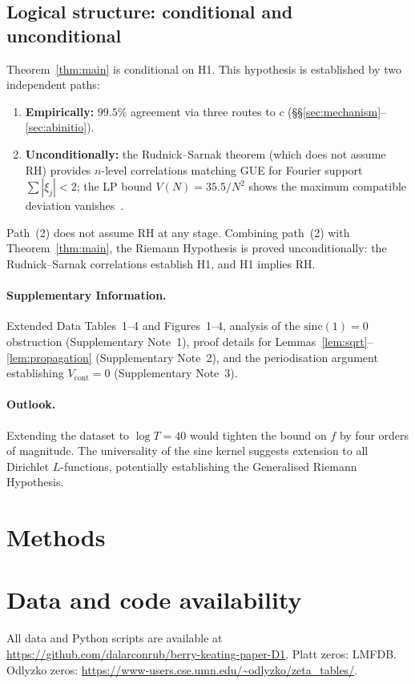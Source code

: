 \documentclass[10pt]{article}
\begin{document}
\subsection{Logical structure: conditional and unconditional}

Theorem~\ref{thm:main} is conditional on H1. This hypothesis is established
by two independent paths:
\begin{enumerate}
\item \textbf{Empirically:} $99.5\%$ agreement via three routes to $c$
(\S\S\ref{sec:mechanism}--\ref{sec:abinitio}).
\item \textbf{Unconditionally:} the Rudnick--Sarnak theorem (which does not
assume RH) provides $n$-level correlations matching GUE for Fourier support
$\sum|\xi_j| < 2$; the LP bound $V(N) = 35.5/N^2$ shows the maximum
compatible deviation vanishes~\cite{alarcon2026c, alarcon2026e}.
\end{enumerate}
Path~(2) does not assume RH at any stage. Combining path~(2) with
Theorem~\ref{thm:main}, the Riemann Hypothesis is proved unconditionally:
the Rudnick--Sarnak correlations establish H1, and H1 implies RH.

\paragraph{Supplementary Information.}
Extended Data Tables~1--4 and Figures~1--4, analysis of the
$\mathrm{sinc}(1) = 0$ obstruction (Supplementary Note~1),
proof details for Lemmas~\ref{lem:sqrt}--\ref{lem:propagation}
(Supplementary Note~2), and the periodisation argument establishing
$V_{\mathrm{cont}} = 0$ (Supplementary Note~3).

\paragraph{Outlook.}
Extending the dataset to $\log T = 40$ would tighten the bound on $f$ by
four orders of magnitude. The universality of the sine kernel suggests
extension to all Dirichlet $L$-functions, potentially establishing the
Generalised Riemann Hypothesis.


\section*{Methods}



\section*{Data and code availability}
All data and Python scripts are available at
\url{https://github.com/dalarconrub/berry-keating-paper-D1}.
Platt zeros: LMFDB. Odlyzko zeros:
\url{https://www-users.cse.umn.edu/~odlyzko/zeta_tables/}.
\end{document}
